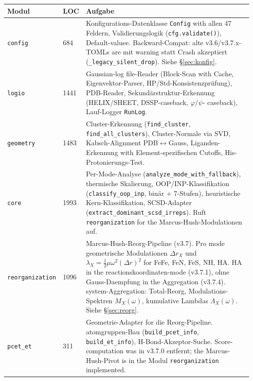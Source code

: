 \documentclass[11pt,a4paper,twoside]{article}
\theoremstyle{remark}
\begin{document}
\begin{longtable}{p{} p{} p{}}
\toprule
\textbf{Modul} & \textbf{LOC} & \textbf{Aufgabe} \\
\midrule
\endhead

\texttt{config} & 684 & Konfigurations-Datenklasse \texttt{Config}
  with allen 47 Feldern, Validierungslogik (\texttt{cfg.validate()}),
  Default-valuee. Backward-Compat: alte v3.6/v3.7.x-TOMLs are mit
  warning statt Crash akzeptiert (\texttt{\_legacy\_silent\_drop}).
  Siehe \S\ref{sec:konfig}. \\

\texttt{logio} & 1441 & Gaussian-log file-Reader (Block-Scan with Cache,
  Eigenvektor-Parser, HP/Std-Konsistenzpr\"ufung), PDB-Reader,
  Sekund\"arstruktur-Erkennung (HELIX/SHEET, DSSP-caseback, $\varphi/\psi$-
  caseback), Lauf-Logger \texttt{RunLog}. \\

\texttt{geometry} & 1483 & Cluster-Erkennung
  (\texttt{find\_cluster}, \texttt{find\_all\_clusters}),
  Cluster-Normale via SVD, Kabsch-Alignment PDB$\leftrightarrow$Gauss,
  Liganden-Erkennung with Element-spezifischen Cutoffs,
  His-Protonierungs-Test. \\

\texttt{core} & 1993 & Per-Mode-Analyse (\texttt{analyze\_mode\_with\_fallback}),
  thermische Skalierung, OOP/INP-Klassifikation
  (\texttt{classify\_oop\_inp}, bin\"ar + 7-Stufen),
  heuristische Kern-Klassifikation, SCSD-Adapter
  (\texttt{extract\_dominant\_scsd\_irreps}). Ruft
  \texttt{reorganization} for the Marcus-Hush-Modulationen auf. \\

\texttt{reorganization} & 1096 & Marcus-Hush-Reorg-Pipeline (v3.7).
  Pro mode geometrische Modulationen $\Delta r_X$ und
  $\lambda_X = \tfrac{1}{2}\mu\omega^2(\Delta r)^2$ for FeFe, FeN,
  FeS, NH, HA. HA in the reactionskoordinaten-mode (v3.7.1), ohne
  Gauss-Daempfung in the Aggregation (v3.7.4).
  system-Aggregation: Total-Reorg, Modulations-Spektren $M_X(\omega)$,
  kumulative Lambdas $\Lambda_X(\omega)$. Siehe \S\ref{sec:reorg}. \\

\texttt{pcet\_et} & 311 & Geometrie-Adapter for die
  Reorg-Pipeline. atomgruppen-Bau (\texttt{build\_pcet\_info},
  \texttt{build\_et\_info}), H-Bond-Akzeptor-Suche.
  Score-computation was in v3.7.0 entfernt; the Marcus-Hush-Pivot
  is in the Modul \texttt{reorganization} implemented. \\


\end{longtable}
\end{document}
